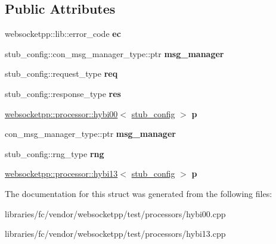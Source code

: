 \subsection*{Public Attributes}
\begin{DoxyCompactItemize}
\item 
\mbox{\label{structprocessor__setup_a4317b669be75123ab3301f66890e8ccc}} 
websocketpp\+::lib\+::error\+\_\+code {\bfseries ec}
\item 
\mbox{\label{structprocessor__setup_a7e5874fd9215c912a4b45a5595d393b6}} 
stub\+\_\+config\+::con\+\_\+msg\+\_\+manager\+\_\+type\+::ptr {\bfseries msg\+\_\+manager}
\item 
\mbox{\label{structprocessor__setup_a980e15fe985e1b98b603d7cdfe7c59ae}} 
stub\+\_\+config\+::request\+\_\+type {\bfseries req}
\item 
\mbox{\label{structprocessor__setup_a4f0a5fc919ad24998c07b4e9ea14497e}} 
stub\+\_\+config\+::response\+\_\+type {\bfseries res}
\item 
\mbox{\label{structprocessor__setup_a59097e2a73856213db06663c439f45dd}} 
\mbox{\hyperlink{classwebsocketpp_1_1processor_1_1hybi00}{websocketpp\+::processor\+::hybi00}}$<$ \mbox{\hyperlink{structstub__config}{stub\+\_\+config}} $>$ {\bfseries p}
\item 
\mbox{\label{structprocessor__setup_a9243eed7f1b4feff6e614372bc95a97d}} 
con\+\_\+msg\+\_\+manager\+\_\+type\+::ptr {\bfseries msg\+\_\+manager}
\item 
\mbox{\label{structprocessor__setup_a7bbb72ae0cad9525e149c1c3b3f7d61f}} 
stub\+\_\+config\+::rng\+\_\+type {\bfseries rng}
\item 
\mbox{\label{structprocessor__setup_a99c2a7222df023e004a08981332c19e8}} 
\mbox{\hyperlink{classwebsocketpp_1_1processor_1_1hybi13}{websocketpp\+::processor\+::hybi13}}$<$ \mbox{\hyperlink{structstub__config}{stub\+\_\+config}} $>$ {\bfseries p}
\end{DoxyCompactItemize}


The documentation for this struct was generated from the following files\+:\begin{DoxyCompactItemize}
\item 
libraries/fc/vendor/websocketpp/test/processors/hybi00.\+cpp\item 
libraries/fc/vendor/websocketpp/test/processors/hybi13.\+cpp\end{DoxyCompactItemize}
